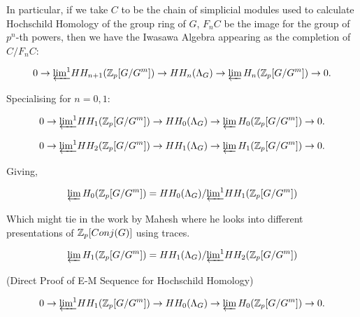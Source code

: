In particular, if we take $C$ to be the chain of simplicial modules used to calculate Hochschild Homology of the group ring of $G$, $F_nC$ be the image for the group of $p^n$-th powers, then we have the Iwasawa Algebra appearing as the completion of $C/F_nC$:

$$0 \rightarrow  \underleftarrow{\text{lim}^1} HH_{n+1}(\mathbb Z_p[G/G^m]) \rightarrow HH_n(\Lambda_G) \rightarrow  \underleftarrow{\text{lim}}\,H_n(\mathbb Z_p[G/G^m]) \rightarrow 0.$$ 

Specialising for $n = 0,1$:

$$0 \rightarrow  \underleftarrow{\text{lim}^1} HH_{1}(\mathbb Z_p[G/G^m]) \rightarrow HH_0(\Lambda_G) \rightarrow  \underleftarrow{\text{lim}}\,H_0(\mathbb Z_p[G/G^m]) \rightarrow 0.$$ 

$$0 \rightarrow  \underleftarrow{\text{lim}^1} HH_{2}(\mathbb Z_p[G/G^m]) \rightarrow HH_1(\Lambda_G) \rightarrow  \underleftarrow{\text{lim}}\,H_1(\mathbb Z_p[G/G^m]) \rightarrow 0.$$ 

Giving,

$$ \underleftarrow{\text{lim}}\,H_0(\mathbb Z_p[G/G^m]) =    HH_0(\Lambda_G) / \underleftarrow{\text{lim}^1} HH_{1}(\mathbb Z_p[G/G^m])$$

Which might tie in the work by Mahesh where he looks into different presentations of $\mathbb Z_p [Conj(G)]$ using traces.

$$ \underleftarrow{\text{lim}}\,H_1(\mathbb Z_p[G/G^m]) =    HH_1(\Lambda_G) / \underleftarrow{\text{lim}^1} HH_{2}(\mathbb Z_p[G/G^m])$$

\begin{proposition}(Direct Proof of E-M Sequence for Hochschild Homology)

$$0 \rightarrow  \underleftarrow{\text{lim}^1} HH_{1}(\mathbb Z_p[G/G^m]) \rightarrow HH_0(\Lambda_G) \rightarrow  \underleftarrow{\text{lim}}\,H_0(\mathbb Z_p[G/G^m]) \rightarrow 0.$$ 
\end{proposition}


